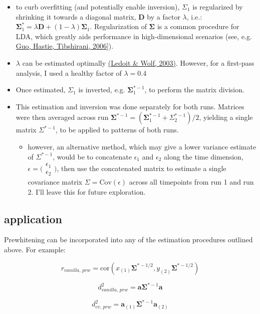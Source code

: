 \documentclass{article}\usepackage[]{graphicx}\usepackage[]{color}
\begin{document}
\begin{itemize}
  \item to curb overfitting (and potentially enable inversion), $\Sigma_1$ is regularized by shrinking it towards a diagonal matrix, \textbf{D} by a factor $\lambda$, i.e.: 
    $\mathbf{\Sigma}^*_1 = \lambda \mathbf{D} + (1 - \lambda) \mathbf{\Sigma}_1$.
    Regularization of $\mathbf{\Sigma}$ is a common procedure for LDA, which greatly aids performance in high-dimensional scenarios (see, e.g. \href{https://doi.org/10.1093/biostatistics/kxj035}{Guo, Hastie, Tibshirani, 2006}]).
  \item $\lambda$ can be estimated optimally \href{https://repositori.upf.edu/bitstream/handle/10230/560/691.pdf}{(Ledoit \& Wolf, 2003)}.
    However, for a first-pass analysis, I used a healthy factor of $\lambda = 0.4$
  \item Once estimated, $\Sigma_1$ is inverted, e.g. $\mathbf{\Sigma}^{*-1}_1$, to perform the matrix division.
  \item This estimation and inversion was done separately for both runs. Matrices were then averaged across run
    $\mathbf{\Sigma}^{*-1} = (\mathbf{\Sigma}^{*-1}_1 + \Sigma^{*-1}_2)/2$, yielding a single matrix $\Sigma^{*-1}$, to be applied to patterns of both runs.
    \begin{itemize}
      \item however, an alternative method, which may give a lower variance estimate of $\Sigma^{*-1}$, would be to concatenate $\epsilon_1$ and $\epsilon_2$ along the time dimension,
        $\epsilon = \big(\begin{smallmatrix}
        \epsilon_1\\
        \epsilon_2
        \end{smallmatrix}\big)$,
        then use the concatenated matrix to estimate a single covariance matrix $\Sigma = \text{Cov}(\epsilon)$ across all timepoints from run 1 and run 2.
        I'll leave this for future exploration.
    \end{itemize}
\end{itemize}


\subsection*{application}

Prewhitening can be incorporated into any of the estimation procedures outlined above.
For example:

\[r_\textit{vanilla, prw} = \text{cor}(x_{(1)}\mathbf{\Sigma}^{*-1/2}, y_{(2)}\mathbf{\Sigma}^{*-1/2})\]

\[d^2_\textit{vanilla, prw} = \mathbf{a} \mathbf{\Sigma}^{*-1} \mathbf{a}\]

\[d^2_\textit{cv, prw} = \mathbf{a}_{(1)} \mathbf{\Sigma}^{*-1} \mathbf{a}_{(2)}\]
\end{document}
